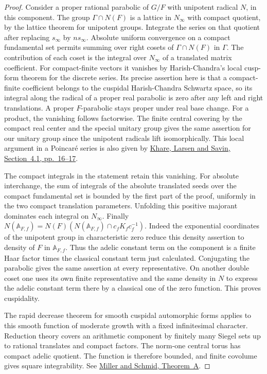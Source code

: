 \documentclass[a4paper,11pt]{article}
\theoremstyle{definition}
\theoremstyle{remark}
\numberwithin{equation}{section}
\begin{document}
\begin{proof}
Consider a proper rational parabolic of \(G/F\) with unipotent radical
\(N\), in this component. The group \(\Gamma\cap N(F)\) is a lattice
in \(N_\infty\) with compact quotient, by the lattice theorem for
unipotent groups. Integrate the series on that quotient after replacing
\(s_\infty\) by \(n s_\infty\). Absolute uniform convergence on a compact
fundamental set permits summing over right cosets of \(\Gamma\cap N(F)\)
in \(\Gamma\). The contribution of each coset is the integral over
\(N_\infty\) of a translated matrix coefficient. For compact-finite
vectors it vanishes by Harish-Chandra's local cusp-form theorem for the
discrete series. Its precise assertion here is that a compact-finite
coefficient belongs to the cuspidal Harish-Chandra Schwartz space,
so its integral along the radical of a proper real parabolic is zero
after any left and right translations. A proper \(F\)-parabolic stays
proper under real base change. For a product, the vanishing follows
factorwise. The finite central covering by the compact real center
and the special unitary group gives the same assertion for our unitary
group since the unipotent radicals lift isomorphically. This local
argument in a Poincar\'e series is also given by
\href{https://www.math.utah.edu/~savin/langlands30.pdf}{Khare, Larsen and
Savin, Section~4.1, pp.~16--17}.

The compact integrals in the statement retain this vanishing. For
absolute interchange, the sum of integrals of the absolute translated
seeds over the compact fundamental set is bounded by the first part
of the proof, uniformly in the two compact translation parameters.
Unfolding this positive majorant dominates each integral on \(N_\infty\).
Finally \(N(\mathbb A_{F,f})=N(F)(N(\mathbb A_{F,f})\cap c_fK_fc_f^{-1})\).
Indeed the exponential coordinates of the unipotent group in
characteristic zero reduce this density assertion to density of \(F\) in \(\mathbb A_{F,f}\). Thus the adelic constant
term on the component is a finite Haar factor times the classical
constant term just calculated. Conjugating the parabolic gives the
same assertion at every representative. On another double coset
one uses its own finite representative and the same density in \(N\)
to express the adelic constant term there by a classical one of the
zero function. This proves cuspidality.

The rapid decrease theorem for smooth cuspidal automorphic forms applies
to this smooth function of moderate growth with a fixed infinitesimal
character. Reduction theory covers an arithmetic component by finitely
many Siegel sets up to rational translates and compact factors. The
norm-one central torus has compact adelic quotient. The function is
therefore bounded, and finite covolume gives square integrability.
See \href{https://arxiv.org/abs/1106.2149}{Miller and Schmid, Theorem~A}.
\end{proof}
\end{document}
